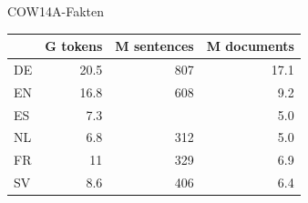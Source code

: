 \begin{frame}
  {COW14A-Fakten}
  \begin{center}
    \begin{tabular}[h]{lrrr}
      \hline
            & G tokens & M sentences & M documents \\
      \hline
      \hline
      DE & 20.5 & 807 & 17.1 \\
      EN & 16.8 & 608 & 9.2 \\
      ES & 7.3 & &      5.0 \\
      NL & 6.8 & 312 &  5.0 \\
      FR & 11  & 329 &  6.9 \\
      SV & 8.6 & 406 &  6.4 \\
      \hline
    \end{tabular}
  \end{center}
\end{frame}


